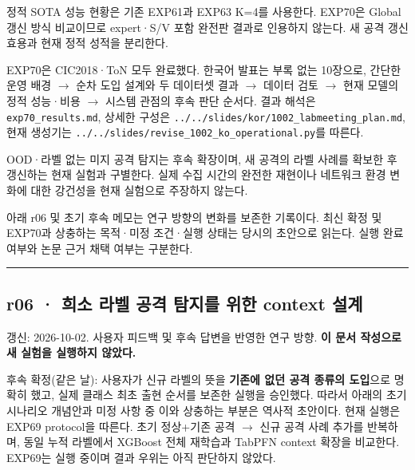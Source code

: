 \par\noindent \textbullet\enspace 정적 SOTA 성능 현황은 기존 EXP61과 EXP63 K=\allowbreak{}4를 사용한다. EXP70은 Global 갱신 방식 비교이므로 expert·S/\allowbreak{}V 포함 완전판 결과로 인용하지 않는다. 새 공격 갱신 효용과 현재 정적 성적을 분리한다.


\par\noindent \textbullet\enspace EXP70은 CIC2018·ToN 모두 완료했다. 한국어 발표는 부록 없는 10장으로, 간단한 운영 배경  \ensuremath{\rightarrow}  순차 도입 설계와 두 데이터셋 결과  \ensuremath{\rightarrow}  데이터 검토  \ensuremath{\rightarrow}  현재 모델의 정적 성능·비용  \ensuremath{\rightarrow}  시스템 관점의 후속 판단 순서다. 결과 해석은 \texttt{exp70\_\allowbreak{}\allowbreak{}re\allowbreak{}sults.\allowbreak{}md\allowbreak{}}, 상세한 구성은 \texttt{.\allowbreak{}.\allowbreak{}/\allowbreak{}\allowbreak{}.\allowbreak{}.\allowbreak{}/\allowbreak{}\allowbreak{}sl\allowbreak{}ides/\allowbreak{}\allowbreak{}kor\allowbreak{}/\allowbreak{}\allowbreak{}1002\_\allowbreak{}\allowbreak{}la\allowbreak{}bmeeting\allowbreak{}\_\allowbreak{}\allowbreak{}plan.\allowbreak{}md\allowbreak{}}, 현재 생성기는 \texttt{.\allowbreak{}.\allowbreak{}/\allowbreak{}\allowbreak{}.\allowbreak{}.\allowbreak{}/\allowbreak{}\allowbreak{}sl\allowbreak{}ides/\allowbreak{}\allowbreak{}rev\allowbreak{}ise\_\allowbreak{}\allowbreak{}1002\allowbreak{}\_\allowbreak{}\allowbreak{}ko\_\allowbreak{}\allowbreak{}oper\allowbreak{}ational.\allowbreak{}py}를 따른다.


\par\noindent \textbullet\enspace OOD·라벨 없는 미지 공격 탐지는 후속 확장이며, 새 공격의 라벨 사례를 확보한 후 갱신하는 현재 실험과 구별한다. 실제 수집 시간의 완전한 재현이나 네트워크 환경 변화에 대한 강건성을 현재 실험으로 주장하지 않는다.


아래 r06 및 초기 후속 메모는 연구 방향의 변화를 보존한 기록이다. 최신 확정 및 EXP70과 상충하는 목적·미정 조건·실행 상태는 당시의 초안으로 읽는다. 실행 완료 여부와 논문 근거 채택 여부는 구분한다.


\medskip\hrule\medskip
\subsection{r06 · 희소 라벨 공격 탐지를 위한 context 설계}
갱신: 2026-10-02. 사용자 피드백 및 후속 답변을 반영한 연구 방향. \textbf{이 문서 작성으로 새 실험을 실행하지 않았다.}

후속 확정(같은 날): 사용자가 신규 라벨의 뜻을 \textbf{기존에 없던 공격 종류의 도입}으로 명확히 했고, 실제 클래스 최초 출현 순서를 보존한 실행을 승인했다. 따라서 아래의 초기 시나리오 개념안과 미정 사항 중 이와 상충하는 부분은 역사적 초안이다. 현재 실행은 EXP69 protocol을 따른다. 초기 정상+\allowbreak{}기존 공격  \ensuremath{\rightarrow}  신규 공격 사례 추가를 반복하며, 동일 누적 라벨에서 XGBoost 전체 재학습과 TabPFN context 확장을 비교한다. EXP69는 실행 중이며 결과 우위는 아직 판단하지 않았다.

